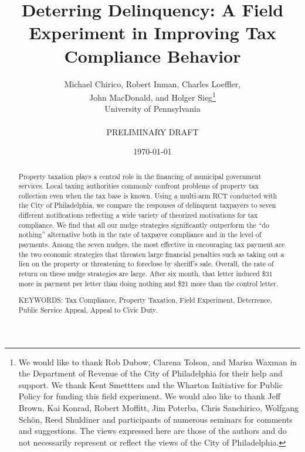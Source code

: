 \documentclass[12pt]{article}
\renewcommand{\thefootnote}{\fnsymbol{footnote}}
\begin{document}
\title{Deterring Delinquency: A Field Experiment in Improving Tax Compliance Behavior}

\author{Michael Chirico, Robert Inman, Charles Loeffler, \\ John
  MacDonald, and Holger Sieg\thanks{We would like to thank Rob Dubow, 
  Clarena Tolson, and  Marisa Waxman  in the Department of Revenue 
  of the City of Philadelphia for their help and support. We thank Kent 
  Smettters and  the Wharton Initiative for Public Policy for
    funding this field experiment. We would also like to thank Jeff Brown, Kai Konrad, 
    Robert Moffitt, 
    Jim Poterba, Chris Sanchirico, Wolfgang Sch\"on, Reed Shuldiner and
    participants of numerous seminars for comments and
    suggestions. The views expressed here are those of the authors and
    do not necessarily represent or reflect the views of the City of
    Philadelphia.}  \\ University of Pennsylvania \\
    \\
    PRELIMINARY DRAFT}

\date{\today}

\maketitle

\begin{abstract}

Property taxation plays a central role in the financing of municipal
government services. Local taxing authorities commonly confront
problems of property tax collection even when the tax base is known.
Using a multi-arm RCT conducted with the City of Philadelphia, we
compare the responses of delinquent taxpayers to seven different notifications
reflecting a wide variety of theorized motivations for tax
compliance. We find that all our nudge strategies significantly
outperform the ``do nothing'' alternative both in the rate of taxpayer
compliance and in the level of payments.  Among the seven nudges, the
most effective in encouraging tax payment are the two economic
strategies that threaten large financial penalties such as
taking out a lien on the property or threatening to foreclose by
sheriff's sale.  Overall, the rate of return on these nudge strategies
are large. After six month, that letter induced \$31 more in payment
per letter than doing nothing and \$21 more than the control letter.

\bigskip

\noindent KEYWORDS: Tax Compliance, Property Taxation, Field
Experiment, Deterrence, Public Service Appeal, Appeal to Civic Duty.

\end{abstract}
\renewcommand{\thefootnote}{\arabic{footnote}}
\end{document}
